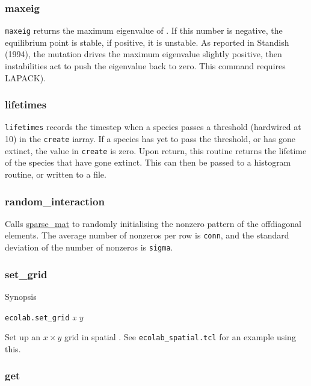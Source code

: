 \subsubsection{maxeig}\label{maxeig}

\verb|maxeig| returns the maximum eigenvalue of \bbeta. If this number
is negative, the equilibrium point is stable, if positive, it is
unstable. As reported in Standish (1994)\cite{Standish94}, the mutation
drives the maximum eigenvalue slightly positive, then instabilities
act to push the eigenvalue back to zero. This command requires LAPACK).

\subsubsection{lifetimes}\label{lifetimes}

\verb|lifetimes| records the timestep when a
species passes a threshold (hardwired at 10) in the {\tt create}
iarray. If a species has yet to pass the threshold, or has gone
extinct, the value in {\tt create} is zero. Upon return, this routine
returns the lifetime of the species that have gone extinct. This can
then be passed to a histogram routine, or written to a file.

\subsubsection{random\_interaction}\label{random_interaction}

Calls \hyperref{{\protect\tt sparse\_mat::init\_rand()}}{(See \S}{)}{sparse_mat} to randomly initialising the nonzero pattern of
the offdiagonal elements. The average number of nonzeros per row is
{\tt conn}, and the standard deviation of the number of nonzeros is
{\tt sigma}.

\subsubsection{set\_grid}

Synopsis

{\tt ecolab.set\_grid} {\em x} {\em y}

\noindent Set up an $x\times y$ grid in spatial \EcoLab. See
\verb+ecolab_spatial.tcl+ for an example using this.

\subsubsection{get}

